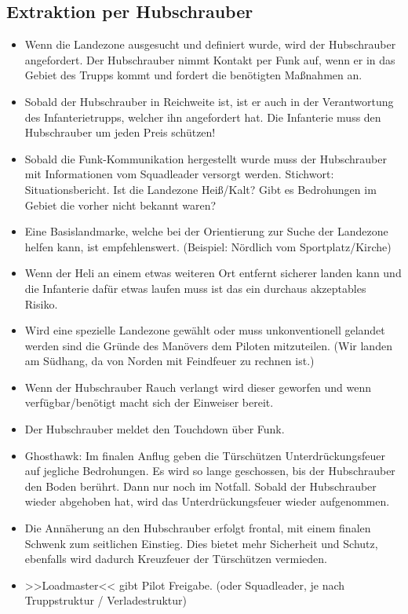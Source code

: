 \subsection{Extraktion per Hubschrauber}
 	\begin{itemize} 
		\item Wenn die Landezone ausgesucht und definiert wurde, wird der Hubschrauber angefordert. Der Hubschrauber nimmt Kontakt per Funk auf, wenn er in das Gebiet des Trupps kommt und fordert die benötigten Maßnahmen an.

		\item Sobald der Hubschrauber in Reichweite ist, ist er auch in der Verantwortung des Infanterietrupps, welcher ihn angefordert hat. Die Infanterie muss den Hubschrauber um jeden Preis schützen!

		\item Sobald die Funk-Kommunikation hergestellt wurde muss der Hubschrauber mit Informationen vom Squadleader versorgt werden. Stichwort: Situationsbericht. Ist die Landezone Heiß/Kalt? Gibt es Bedrohungen im Gebiet die vorher nicht bekannt waren?

		\item Eine Basislandmarke, welche bei der Orientierung zur Suche der Landezone helfen kann, ist empfehlenswert. (Beispiel: Nördlich vom Sportplatz/Kirche)

		\item Wenn der Heli an einem etwas weiteren Ort entfernt sicherer landen kann und die Infanterie dafür etwas laufen muss ist das ein durchaus akzeptables Risiko.

		\item Wird eine spezielle Landezone gewählt oder muss unkonventionell gelandet werden sind die Gründe des Manövers dem Piloten mitzuteilen. (Wir landen am Südhang, da von Norden mit Feindfeuer zu rechnen ist.)

		\item Wenn der Hubschrauber Rauch verlangt wird dieser geworfen und wenn verfügbar/benötigt macht sich der Einweiser bereit.

		\item Der Hubschrauber meldet den Touchdown über Funk.

		\item Ghosthawk: Im finalen Anflug geben die Türschützen Unterdrückungsfeuer auf jegliche Bedrohungen. Es wird so lange geschossen, bis der Hubschrauber den Boden berührt. Dann nur noch im Notfall. Sobald der Hubschrauber wieder abgehoben hat, wird das Unterdrückungsfeuer wieder aufgenommen.

		\item Die Annäherung an den Hubschrauber erfolgt frontal, mit einem finalen Schwenk zum seitlichen Einstieg. Dies bietet mehr Sicherheit und Schutz, ebenfalls wird dadurch Kreuzfeuer der Türschützen vermieden.

		\item >>Loadmaster<< gibt Pilot Freigabe. (oder Squadleader, je nach Truppstruktur / Verladestruktur)
	\end{itemize}

